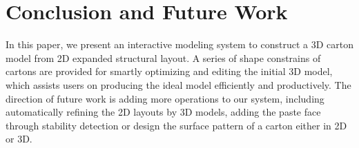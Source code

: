 \documentclass[submission]{gmp2018}
\begin{document}

\section{Conclusion and Future Work}\label{sec:conclusion}
In this paper, we present an interactive modeling system to construct a 3D carton model from 2D expanded structural layout. A series of shape constrains of cartons are provided for smartly optimizing and editing the initial 3D model, which assists users on producing the ideal model efficiently and productively. 
The direction of future work is adding more operations to our system, including automatically refining the 2D layouts by 3D models,  adding the paste face through stability detection or design the surface pattern of a carton either in 2D or 3D. 




\end{document}
